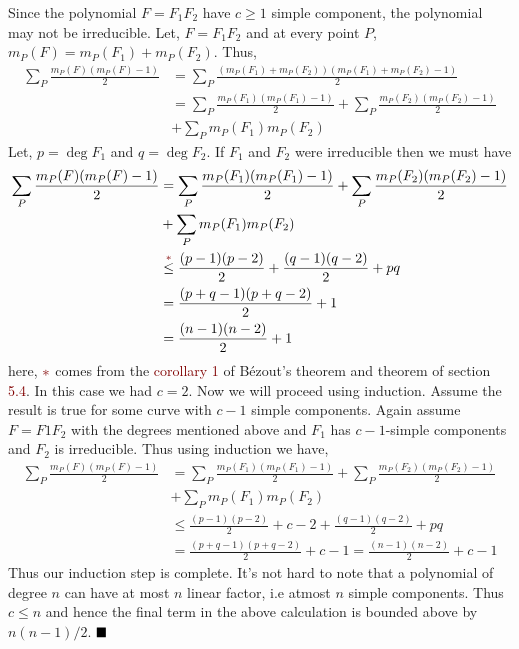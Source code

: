\documentclass[12pt]{article}
\begin{document}
Since the polynomial $F=F_1F_2$ have $c\geq 1$ simple component, the polynomial may not be irreducible. Let, $F=F_1F_2$ and at every point $P$, $m_P(F)= m_P(F_1)+m_P(F_2)$. Thus, \begin{align*}
   \sum_P \frac{m_P(F)(m_P(F)-1)}{2} &= \sum_{P} \frac{(m_P(F_1)+m_P(F_2))(m_P(F_1)+m_P(F_2)-1)}{2} \\
   &= \sum_{P} \frac{m_P(F_1)(m_P(F_1)-1)}{2} + \sum_{P} \frac{m_P(F_2)(m_P(F_2)-1)}{2}  \\&+ \sum_{P}m_P(F_1)m_P(F_2)
\end{align*}
Let, $p = \deg F_1$ and $q = \deg F_2$. If $F_1$ and $F_2$ were irreducible then we must have \begin{align*}
   \sum_P \frac{m_P(F)(m_P(F)-1)}{2} 
   &= \sum_{P} \frac{m_P(F_1)(m_P(F_1)-1)}{2} + \sum_{P} \frac{m_P(F_2)(m_P(F_2)-1)}{2}  \\&+ \sum_{P}m_P(F_1)m_P(F_2) \\
   &\overset{\textcolor{maroon}{\ast}}{\leq} \frac{(p-1)(p-2)}{2}+\frac{(q-1)(q-2)}{2} + pq \\
   &= \frac{(p+q-1)(p+q-2)}{2} +1 \\
   &= \frac{(n-1)(n-2)}{2}+1
\end{align*}
here, $\textcolor{maroon}{\ast}$ comes from the \textcolor{maroon}{corollary 1} of B\'ezout's theorem and theorem of section \textcolor{maroon}{5.4}. In this case we had $c=2$. Now we will proceed using induction. Assume the result is true for some curve with $c-1$ simple components. Again assume $F=F1F_2$ with the degrees mentioned above and $F_1$ has $c-1$-simple components and $F_2$ is irreducible. Thus using induction we have, 
\begin{align*}
   \sum_P \frac{m_P(F)(m_P(F)-1)}{2} 
   &= \sum_{P} \frac{m_P(F_1)(m_P(F_1)-1)}{2} + \sum_{P} \frac{m_P(F_2)(m_P(F_2)-1)}{2}  \\&+ \sum_{P}m_P(F_1)m_P(F_2)\\
   & \leq \frac{(p-1)(p-2)}{2}+c-2+\frac{(q-1)(q-2)}{2} + pq\\
   &= \frac{(p+q-1)(p+q-2)}{2} +c-1 = \frac{(n-1)(n-2)}{2}+c-1
\end{align*}
Thus our induction step is complete. It's not hard to note that a polynomial of degree $n$ can have at most $n$ linear factor, i.e atmost $n$ simple components. Thus $c \leq n$ and hence the final term in the above calculation is bounded above by $n(n-1)/2$. $\hfill\blacksquare$
\end{document}
